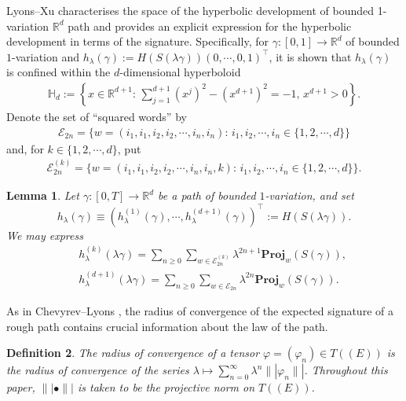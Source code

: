 \documentclass[11pt,a4paper,english,reqno]{amsart}
\theoremstyle{plain}
\newtheorem{definition}{Definition}[section]
\newtheorem{lemma}[definition]{Lemma}
\newcommand{\R}{\mathbb{R}}
\newcommand{\1}{\mathbbm{1}}
\newcommand{\proj}{\mathbf{Proj}}
\begin{document}
Lyons--Xu \cite{lyons2017hyperbolic} characterises the space of the hyperbolic development of bounded 1-variation $\mathbb{R}^{d}$ path and provides an explicit expression for the hyperbolic development in terms of the signature. Specifically, for $\gamma: [0, 1] \rightarrow \mathbb{R}^{d}$ of bounded $1$-variation and $h_{\lambda}(\gamma):= H\left(S\left(\lambda\gamma\right)\right) (0, \cdots, 0, 1)^{\top}$, it is shown that $h_{\lambda}(\gamma)$ is confined within the $d$-dimensional hyperboloid
\begin{align*}
    \mathbb{H}_{d}:=\left\{ x\in\R^{d+1}:\, \sum_{j=1}^{d+1} \left(x^j\right)^2 - \left(x^{d+1}\right)^2=-1,\, x^{d+1}>0 \right\}.
\end{align*}
Denote the set of ``squared words'' by
\begin{eqnarray*}
\mathcal{E}_{2n}=\Big\{w = (i_{1}, i_{1}, i_{2}, i_{2}, \cdots, i_{n}, i_{n}) :\,i_1, i_2, \cdots, i_n \in \{1, 2, \cdots, d\}\Big\}
\end{eqnarray*}
and, for $k \in\{1, 2, \cdots, d\}$, put 
\begin{eqnarray*}
\mathcal{E}_{2n}^{(k)}=\Big\{w = (i_{1}, i_{1}, i_{2}, i_{2}, \cdots, i_{n}, i_{n}, k):\,i_1, i_2, \cdots, i_n \in \{1, 2, \cdots, d\}\Big\}.
\end{eqnarray*}


\begin{lemma}\label{lemma_hyperbolic_dev}
Let $\gamma: [0, T] \rightarrow \mathbb{R}^{d}$ be a path of bounded $1$-variation, and set $$h_{\lambda}(\gamma)\equiv \left(h_{\lambda}^{(1)}(\gamma), \cdots, h_{\lambda}^{(d+1)}(\gamma) \right)^{\top} := H\left(S\left(\lambda\gamma\right)\right).$$ We may express
\begin{eqnarray*}
&&h_{\lambda}^{(k)} (\lambda\gamma) = \sum_{n \geq 0} \sum_{ w \in \mathcal{E}_{2n}^{(k)}} \lambda^{2n+1} \proj_{w}(S(\gamma)),\\
&&h_{\lambda}^{(d+1)} (\lambda\gamma) = \sum_{n \geq 0} \sum_{ w \in \mathcal{E}_{2n}} \lambda^{2n}\proj_{w}(S(\gamma)).
\end{eqnarray*}
\end{lemma}



As in Chevyrev--Lyons \cite{cl}, the radius of convergence of the expected signature of a rough path contains crucial information about the law of the path.


\begin{definition}
The radius of convergence of a tensor $\varphi=(\varphi_n) \in T((E))$ is the radius of convergence of the series $\lambda\mapsto \sum_{n=0}^\infty \lambda^n \||\varphi_n\||$. Throughout this paper, $\||\bullet\||$ is taken to be the projective norm on $T((E))$. 
\end{definition}
\end{document}
